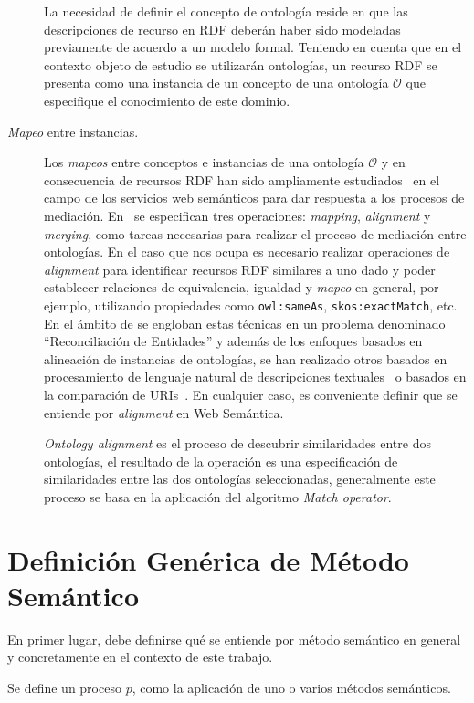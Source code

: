 \begin{description}
La necesidad de definir el concepto de ontología reside en que las descripciones de recurso en RDF deberán
haber sido modeladas previamente de acuerdo a un modelo formal. Teniendo en cuenta que en el contexto objeto de estudio se utilizarán
ontologías, un recurso RDF se presenta como una instancia de un concepto de una ontología $\mathcal{O}$ que 
especifique el conocimiento de este dominio.

\item [\textit{Mapeo} entre instancias.] Los \textit{mapeos} entre conceptos e instancias de una ontología $\mathcal{O}$ y en consecuencia
de recursos RDF han sido ampliamente estudiados~\cite{NM00} en el campo de los servicios web semánticos para dar respuesta a
los procesos de mediación. En~\cite{Bruijin2006} se especifican tres operaciones: \textit{mapping}, \textit{alignment} y \textit{merging}, 
como tareas necesarias para realizar el proceso de mediación entre ontologías. En el caso que nos ocupa
es necesario realizar operaciones de \textit{alignment} para identificar recursos RDF similares a uno dado y poder establecer
relaciones de equivalencia, igualdad y \textit{mapeo} en general, por ejemplo, utilizando propiedades como \texttt{owl:sameAs}, \texttt{skos:exactMatch}, 
etc. En el ámbito de \lod se engloban estas técnicas en un problema denominado ``Reconciliación de Entidades'' y además de los
enfoques basados en alineación de instancias de ontologías, se han realizado otros basados en
procesamiento de lenguaje natural de descripciones textuales~\cite{Serimi} o basados en la comparación de URIs~\cite{Maali_Cyganiak_2011}.
 En cualquier caso, es conveniente definir que se entiende por \textit{alignment} en Web Semántica.

\textit{Ontology alignment} es el proceso de descubrir similaridades entre
dos ontologías, el resultado de la operación es una especificación de similaridades
entre las dos ontologías seleccionadas, generalmente este proceso se basa en la aplicación
del algoritmo \textit{Match operator}.

\end{description}


\section{Definición Genérica de Método Semántico}
En primer lugar, debe definirse qué se entiende por método semántico en general y concretamente en el contexto
de este trabajo.

\begin{definition}[Proceso $p$]
Se define un proceso $p$, como la aplicación de uno o varios métodos semánticos. 
\end{definition}


